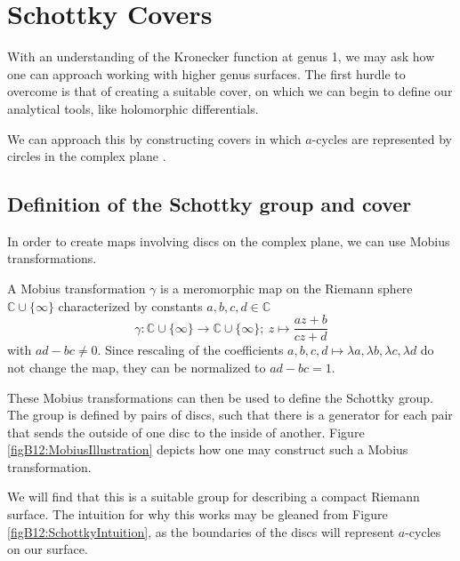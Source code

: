 \section{Schottky Covers}\label{secB12:Schottky}

With an understanding of the Kronecker function at genus 1, we may ask how one can approach working with higher genus surfaces.
The first hurdle to overcome is that of creating a suitable cover, on which we can begin to define our analytical tools, like holomorphic differentials.

We can approach this by constructing covers in which $a$-cycles are represented by circles in the complex plane \cite{ComputationalSchottky} \cite{Cha22}.

\subsection{Definition of the Schottky group and cover}
In order to create maps involving discs on the complex plane, we can use Mobius transformations.

\begin{definition}
    A Mobius transformation $\gamma$ is a meromorphic map on the Riemann sphere $\mathbb C \cup \{\infty\}$ characterized by constants $a,b,c,d \in \mathbb C$
    \begin{equation}
        \gamma : \mathbb C \cup \{\infty\} \rightarrow \mathbb C \cup \{\infty\} ; \ z \mapsto \frac{az+b}{cz+d}
    \end{equation}
    with $ad-bc \neq 0$. Since rescaling of the coefficients $a,b,c,d\mapsto \lambda a,\lambda b, \lambda c, \lambda d$ do not change the map, they can be normalized to $ad-bc=1$.
\end{definition}

These Mobius transformations can then be used to define the Schottky group.
The group is defined by pairs of discs, such that there is a generator for each pair that sends the outside of one disc to the inside of another.
Figure \ref{figB12:MobiusIllustration} depicts how one may construct such a Mobius transformation.

We will find that this is a suitable group for describing a compact Riemann surface. The intuition for why this works may be gleaned from Figure \ref{figB12:SchottkyIntuition}, as the boundaries of the discs will represent $a$-cycles on our surface.

